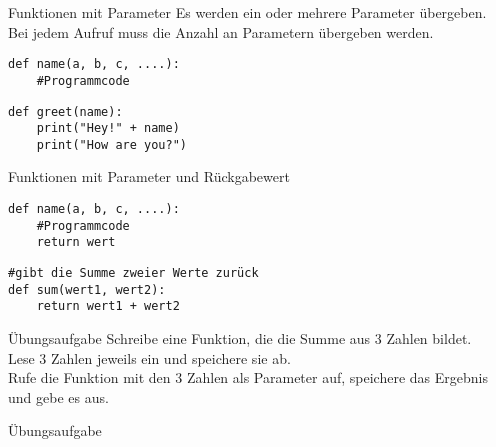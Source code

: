 \begin{frame}[fragile]{Funktionen mit Parameter}
Es werden ein oder mehrere Parameter übergeben. \\
Bei jedem Aufruf muss die Anzahl an Parametern übergeben werden.
\begin{lstlisting}
def name(a, b, c, ....):
	#Programmcode
\end{lstlisting}

\begin{lstlisting}
def greet(name):
	print("Hey!" + name)
	print("How are you?")
\end{lstlisting}
\end{frame}


\begin{frame}[fragile]{Funktionen mit Parameter und Rückgabewert}

\begin{lstlisting}
def name(a, b, c, ....):
	#Programmcode
	return wert
\end{lstlisting}

\begin{lstlisting}
#gibt die Summe zweier Werte zurück
def sum(wert1, wert2):
	return wert1 + wert2	
\end{lstlisting}
\end{frame}

\begin{frame}[fragile]{Übungsaufgabe}
Schreibe eine Funktion, die die Summe aus 3 Zahlen bildet.\\
Lese 3 Zahlen jeweils ein und speichere sie ab.\\
Rufe die Funktion mit den 3 Zahlen als Parameter auf, speichere das Ergebnis und gebe es aus.

\end{frame}


\begin{frame}[fragile]{Übungsaufgabe}


\end{frame}







